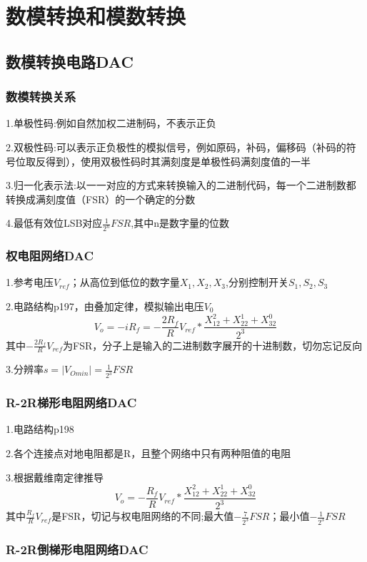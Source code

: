 \documentclass[11pt,twoside,a4paper]{ctexart}
\begin{document}
    
\section{数模转换和模数转换}
\subsection{数模转换电路DAC}
\subsubsection{数模转换关系}

1.单极性码:例如自然加权二进制码，不表示正负

2.双极性码:可以表示正负极性的模拟信号，例如原码，补码，偏移码（补码的符号位取反得到），使用双极性码时其满刻度是单极性码满刻度值的一半

3.归一化表示法:以一一对应的方式来转换输入的二进制代码，每一个二进制数都转换成满刻度值（FSR）的一个确定的分数

4.最低有效位LSB对应$\frac{1}{2^n}FSR$,其中n是数字量的位数

\subsubsection{权电阻网络DAC}

1.参考电压$V_{ref}$；从高位到低位的数字量$X_1,X_2,X_3$,分别控制开关$S_1,S_2,S_3$

2.电路结构p197，由叠加定律，模拟输出电压$V_0$
\[V_o = -iR_f = -\frac{2R_f}{R}V_{ref}*\frac{X_12^2 + X_22^1 + X_32^0}{2^3}\]
其中$-\frac{2R_f}{R}V_{ref}$为FSR，分子上是输入的二进制数字展开的十进制数，切勿忘记反向

3.分辨率$s = |V_{Omin}| = \frac{1}{2^3}FSR$

\subsubsection{R-2R梯形电阻网络DAC}

1.电路结构p198

2.各个连接点对地电阻都是R，且整个网络中只有两种阻值的电阻

3.根据戴维南定律推导
\[V_o = -\frac{R_f}{R}V_{ref} * \frac{X_12^2 + X_22^1 + X_32^0}{2^3}\]
其中$\frac{R_f}{R}V_{ref}$是FSR，切记与权电阻网络的不同;最大值$-\frac{7}{2^3}FSR$；最小值$-\frac{1}{2^3}FSR$

\subsubsection{R-2R倒梯形电阻网络DAC}
\end{document}
